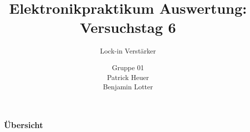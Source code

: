 \documentclass{beamer}
\title{Elektronikpraktikum Auswertung: Versuchstag 6}
\subtitle{Lock-in Verstärker}
\author{Gruppe 01 \\ Patrick Heuer \\ Benjamin Lotter}
\date{}
\begin{document}
\maketitle
\begin{frame}
    \frametitle{Übersicht}
    \tableofcontents
\end{frame}

%


    
\end{document}
